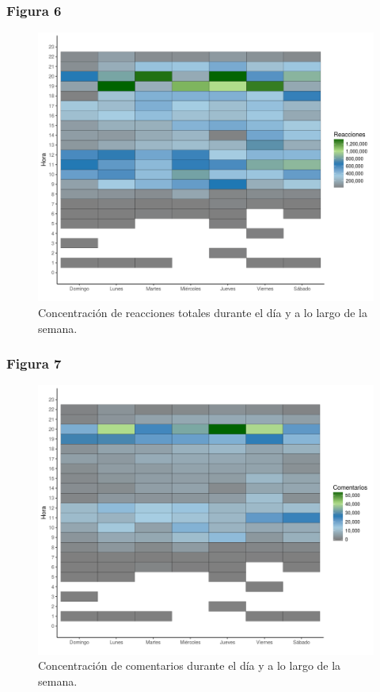 \documentclass[a4paper,10pt]{article}
\begin{document}
\subsubsection{Figura 6}
\begin{figure}[H]
  \begin{center}
   \includegraphics[width=.85\textwidth]{imagenes/figura6.png}
   \captionsetup{width=.80\textwidth}
   \caption{\centering Concentración de reacciones totales durante el día y a 
   lo largo de la semana.} 
  \end{center} 
\end{figure}

\subsubsection{Figura 7}
\begin{figure}[H]
  \begin{center}
   \includegraphics[width=.85\textwidth]{imagenes/figura7.png}
   \captionsetup{width=.80\textwidth}
   \caption{\centering Concentración de comentarios durante el día y a 
   lo largo de la semana.} 
  \end{center} 
\end{figure}
\end{document}

